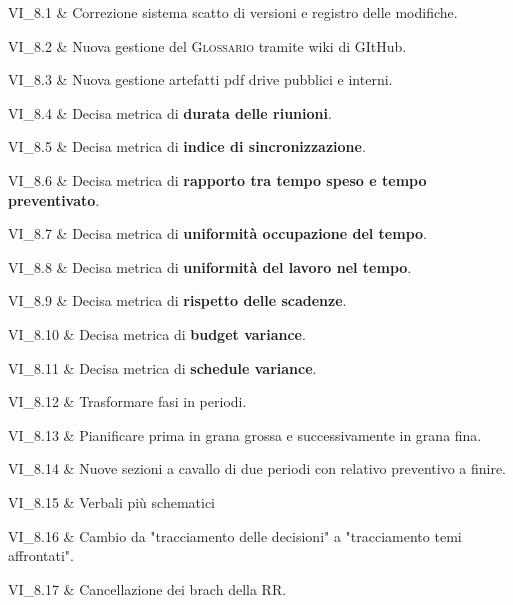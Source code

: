 VI\_8.1 & Correzione sistema scatto di versioni e registro delle modifiche.

\tabularnewline
VI\_8.2 & Nuova gestione del \textsc{Glossario} tramite wiki di GItHub.

\tabularnewline

VI\_8.3 & Nuova gestione artefatti pdf drive pubblici e interni.

\tabularnewline

VI\_8.4 & Decisa metrica di \textbf{durata delle riunioni}.

\tabularnewline

VI\_8.5 & Decisa metrica di \textbf{indice di sincronizzazione}.

\tabularnewline

VI\_8.6 & Decisa metrica di \textbf{rapporto tra tempo speso e tempo preventivato}.

\tabularnewline

VI\_8.7 & Decisa metrica di \textbf{uniformità occupazione del tempo}.

\tabularnewline

VI\_8.8 & Decisa metrica di \textbf{uniformità del lavoro nel tempo}.

\tabularnewline

VI\_8.9 & Decisa metrica di \textbf{rispetto delle scadenze}.

\tabularnewline

VI\_8.10 & Decisa metrica di \textbf{budget variance}.

\tabularnewline

VI\_8.11 & Decisa metrica di \textbf{schedule variance}.

\tabularnewline

VI\_8.12 & Trasformare fasi in periodi.

\tabularnewline

VI\_8.13 & Pianificare prima in grana grossa e successivamente in grana fina.

\tabularnewline

VI\_8.14 & Nuove sezioni a cavallo di due periodi con relativo preventivo a finire.

\tabularnewline

VI\_8.15 & Verbali più schematici

\tabularnewline

VI\_8.16 & Cambio da "tracciamento delle decisioni" a "tracciamento temi affrontati".

\tabularnewline

VI\_8.17 & Cancellazione dei brach della RR.

\tabularnewline